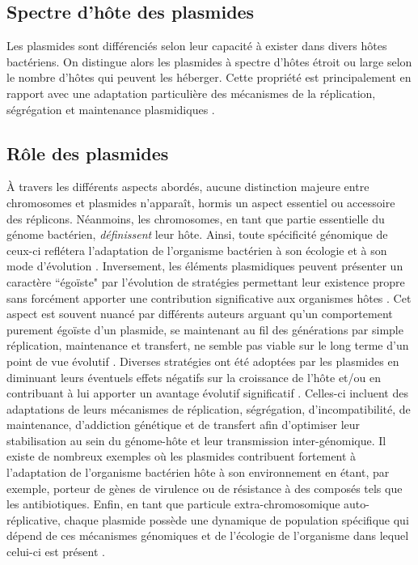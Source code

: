 \subsection{Spectre d'hôte des plasmides}\label{spectrehote}
	Les plasmides sont différenciés selon leur capacité à exister dans divers hôtes bactériens. On distingue alors les plasmides à spectre d'hôtes étroit ou large selon le nombre d'hôtes qui peuvent les héberger. Cette propriété est principalement en rapport avec une adaptation particulière des mécanismes de la réplication, ségrégation et maintenance plasmidiques \citep{Toukdarian2004,jain2013broad}. 
 

\subsection{Rôle des plasmides} 
	À travers les différents aspects abordés, aucune distinction majeure entre chromosomes et plasmides n'apparaît, hormis un aspect essentiel ou accessoire des réplicons. Néanmoins, les chromosomes, en tant que partie essentielle du génome bactérien, \textit{définissent} leur hôte. Ainsi, toute spécificité génomique de ceux-ci reflétera l'adaptation de l'organisme bactérien à son écologie et à son mode d'évolution \citep{bentley2004comparative}. Inversement, les éléments plasmidiques peuvent présenter un caractère ``égoïste" par l'évolution de stratégies permettant leur existence propre sans forcément apporter une contribution significative aux organismes hôtes \citep{Lili2010,thomas2004}. Cet aspect est souvent nuancé par différents auteurs arguant qu'un comportement purement égoïste d'un plasmide, se maintenant au fil des générations par simple réplication, maintenance et transfert, ne semble pas viable sur le long terme d'un point de vue évolutif \citep{thomas2004,Slater2008}. Diverses stratégies ont été adoptées par les plasmides en diminuant leurs éventuels effets négatifs sur la croissance de l'hôte et/ou en contribuant à lui apporter un avantage évolutif significatif \citep{de2007gene,Heuer2008}. Celles-ci incluent des adaptations de leurs mécanismes de réplication, ségrégation, d'incompatibilité, de maintenance, d'addiction génétique et de transfert afin d'optimiser leur stabilisation au sein du génome-hôte et leur transmission inter-génomique. Il existe de nombreux exemples où les plasmides contribuent fortement à l'adaptation de l'organisme bactérien hôte à son environnement en étant, par exemple, porteur de gènes de virulence ou de résistance à des composés tels que les antibiotiques. Enfin, en tant que particule extra-chromosomique auto-réplicative, chaque plasmide possède une dynamique de population spécifique qui dépend de ces mécanismes génomiques et de l'écologie de l'organisme dans lequel celui-ci est présent \citep{Slater2008}.
 

